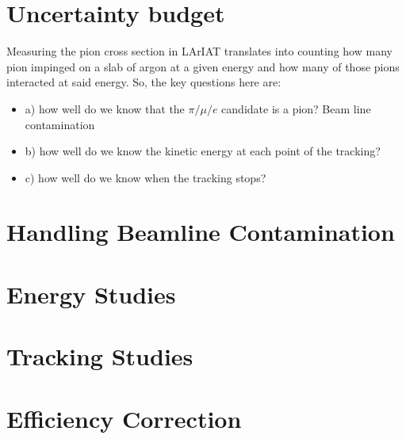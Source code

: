 \section{Uncertainty budget}\label{ch:Uncertainty}
Measuring the pion cross section  in LArIAT translates into counting how many pion impinged on a slab of argon at a given energy and how many of those pions interacted at said energy. So, the key questions here are:
\begin{itemize}
\item[]a) how well do we know that the $\pi/\mu/e$ candidate is a pion? Beam line contamination
\item[]b) how well do we know the kinetic energy at each point of the tracking? %
\item[]c) how well do we know when the tracking stops? %
\end{itemize}


\section{Handling Beamline Contamination}


\section{Energy Studies}

\section{Tracking Studies}

\section{Efficiency Correction}



